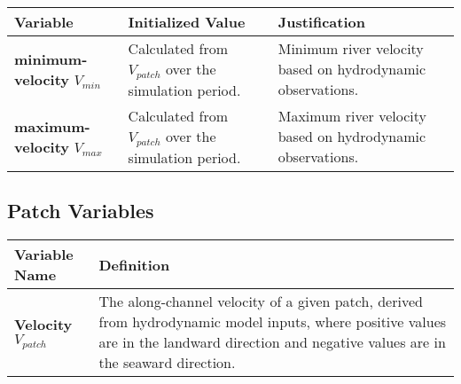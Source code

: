 \documentclass[
]{book}
\begin{document}
\begin{longtable}[]{@{}
  >{\centering\arraybackslash}p{}
  >{\centering\arraybackslash}p{}
  >{\centering\arraybackslash}p{}@{}}
\toprule\noalign{}
\begin{minipage}[b]{\linewidth}\centering
Variable
\end{minipage} & \begin{minipage}[b]{\linewidth}\centering
Initialized Value
\end{minipage} & \begin{minipage}[b]{\linewidth}\centering
Justification
\end{minipage} \\
\midrule\noalign{}
\endhead
\bottomrule\noalign{}
\endlastfoot
\textbf{minimum-velocity} \(V_{min}\) & Calculated from \(V_{patch}\) over the simulation period. & Minimum river velocity based on hydrodynamic observations. \\
\textbf{maximum-velocity} \(V_{max}\) & Calculated from \(V_{patch}\) over the simulation period. & Maximum river velocity based on hydrodynamic observations. \\
\end{longtable}

\subsection{Patch Variables}\label{patch-variables-3}

\begin{longtable}[]{@{}
  >{\centering\arraybackslash}p{}
  >{\centering\arraybackslash}p{}@{}}
\toprule\noalign{}
\begin{minipage}[b]{\linewidth}\centering
Variable Name
\end{minipage} & \begin{minipage}[b]{\linewidth}\centering
Definition
\end{minipage} \\
\midrule\noalign{}
\endhead
\bottomrule\noalign{}
\endlastfoot
\textbf{Velocity} \(V_{patch}\) & The along-channel velocity of a given patch, derived from hydrodynamic model inputs, where positive values are in the landward direction and negative values are in the seaward direction. \\
\end{longtable}
\end{document}
